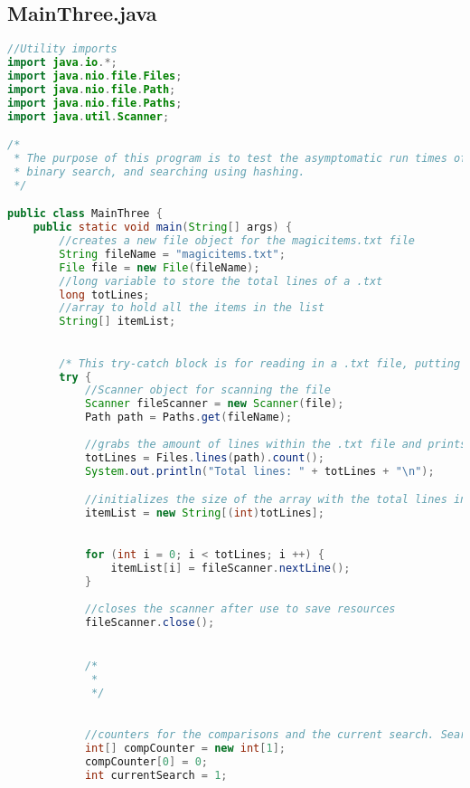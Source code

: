 \documentclass[letterpaper, 10pt,DIV=13]{scrartcl}
\numberwithin{equation}{section} %
\numberwithin{figure}{section} %
\numberwithin{table}{section} %
\begin{document}
\subsection{MainThree.java}

\begin{lstlisting}[frame=single, language=java, breaklines]  
//Utility imports
import java.io.*;
import java.nio.file.Files;
import java.nio.file.Path;
import java.nio.file.Paths;
import java.util.Scanner;

/* 
 * The purpose of this program is to test the asymptomatic run times of different searching algorithms. The algorithms include linear search,
 * binary search, and searching using hashing.
 */

public class MainThree {
    public static void main(String[] args) {
        //creates a new file object for the magicitems.txt file
        String fileName = "magicitems.txt";
        File file = new File(fileName);
        //long variable to store the total lines of a .txt
        long totLines;
        //array to hold all the items in the list
        String[] itemList;

        
        /* This try-catch block is for reading in a .txt file, putting each line onto an array, and throwing exceptions if there are any. */
        try {
            //Scanner object for scanning the file
            Scanner fileScanner = new Scanner(file);
            Path path = Paths.get(fileName);
            
            //grabs the amount of lines within the .txt file and prints it
            totLines = Files.lines(path).count();
            System.out.println("Total lines: " + totLines + "\n");

            //initializes the size of the array with the total lines in the .txt
            itemList = new String[(int)totLines];

            
            for (int i = 0; i < totLines; i ++) {
                itemList[i] = fileScanner.nextLine();
            }
            
            //closes the scanner after use to save resources
            fileScanner.close();


            /* 
             * 
             */
            

            //counters for the comparisons and the current search. Search count starts at 1, and will go to 42
            int[] compCounter = new int[1];
            compCounter[0] = 0;
            int currentSearch = 1;


\end{lstlisting}
\end{document}
